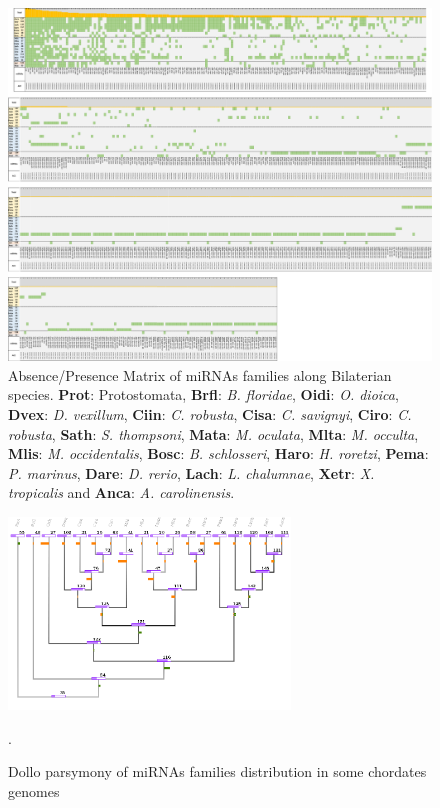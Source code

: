 \documentclass[graybox]{svmult}
\begin{document}
\begin{figure}[ht!]
\centering 
\includegraphics[width=\textwidth, angle=90]{./Images/miRNA_matrix}
\caption{Absence/Presence Matrix of miRNAs families along Bilaterian species. 
\textbf{Prot}: Protostomata, \textbf{Brfl}: \textit{B. floridae}, 
\textbf{Oidi}: \textit{O. dioica}, \textbf{Dvex}: \textit{D. vexillum}, 
\textbf{Ciin}: \textit{C. robusta}, \textbf{Cisa}: \textit{C. savignyi}, 
\textbf{Ciro}: \textit{C. robusta}, \textbf{Sath}: \textit{S. thompsoni}, 
\textbf{Mata}: \textit{M. oculata}, \textbf{Mlta}: \textit{M. occulta}, 
\textbf{Mlis}: \textit{M. occidentalis}, \textbf{Bosc}: \textit{B. schlosseri}, 
\textbf{Haro}: \textit{H. roretzi}, \textbf{Pema}: \textit{P. marinus}, 
\textbf{Dare}: \textit{D. rerio}, \textbf{Lach}: \textit{L. chalumnae}, 
\textbf{Xetr}: \textit{X. tropicalis} and \textbf{Anca}: \textit{A. 
carolinensis}. }
\label{fig:matrimirnas}
\end{figure}

\begin{figure}[t]
\sidecaption[t]
\includegraphics[width=7.5cm]{./Images/last_tree.png}
\caption{Dollo parsymony of miRNAs families distribution in some 
chordates genomes}.
\label{fig:dollotree}
\end{figure}
\end{document}
